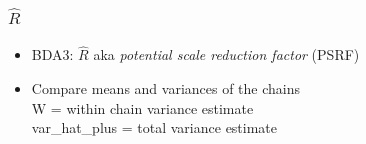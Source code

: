 \documentclass[10pt,handout]{beamer}
\begin{document}
\begin{frame}[fragile]

\frametitle{ $\widehat{R}$}

  \begin{itemize}
  \item BDA3: $\widehat{R}$ aka {\em potential scale reduction factor} (PSRF)
  \item Compare means and variances of the chains\\
    W = within chain variance estimate\\
    var\_hat\_plus = total variance estimate\\
    \vspace{1\baselineskip}
  \end{itemize}

\end{frame}
\end{document}
